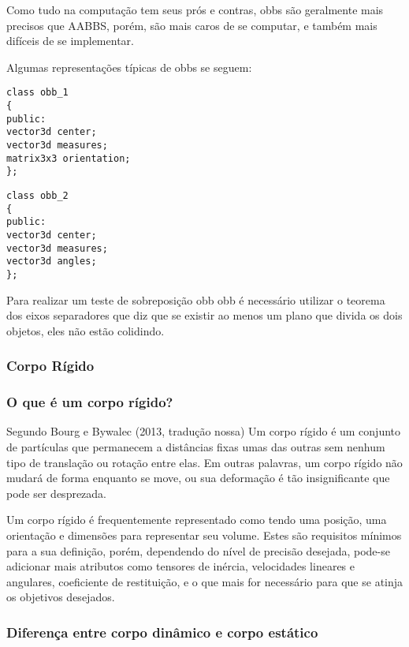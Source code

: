 Como tudo na computação tem seus prós e contras, obbs são geralmente mais
precisos que AABBS, porém, são mais caros de se computar, e também mais
difíceis de se implementar.


Algumas representações típicas de obbs se seguem:

\begin{lstlisting}[frame=single,caption=Código de exemplo\label{codigo1}]
class obb_1
{
public:
vector3d center;
vector3d measures;
matrix3x3 orientation;
};
\end{lstlisting}

\begin{lstlisting}[frame=single,caption=Código de exemplo\label{codigo1}]
class obb_2
{
public:
vector3d center;
vector3d measures;
vector3d angles;
};
\end{lstlisting}

Para realizar um teste de sobreposição obb obb é necessário utilizar o teorema
dos eixos separadores que diz que se existir ao menos um plano que divida os
dois objetos, eles não estão colidindo.



\subsubsection{ Corpo Rígido}
\subsubsection{ O que é um corpo rígido?}

Segundo Bourg e Bywalec (2013, tradução nossa) Um corpo rígido é um conjunto de partículas  que permanecem a distâncias fixas umas das outras  sem nenhum tipo de translação ou rotação entre elas. Em outras palavras,  um corpo rígido não mudará de forma enquanto se move, ou sua deformação é tão insignificante que pode ser desprezada.

Um corpo rígido é  frequentemente representado como tendo uma posição, uma orientação  e  dimensões para representar seu volume. Estes são requisitos mínimos para a  sua definição, porém, dependendo do nível de precisão desejada, pode-se adicionar mais atributos como tensores de inércia, velocidades lineares e angulares, coeficiente de restituição, e o que mais for necessário para que se atinja os objetivos desejados.

\subsubsection{ Diferença entre corpo dinâmico e corpo estático}

